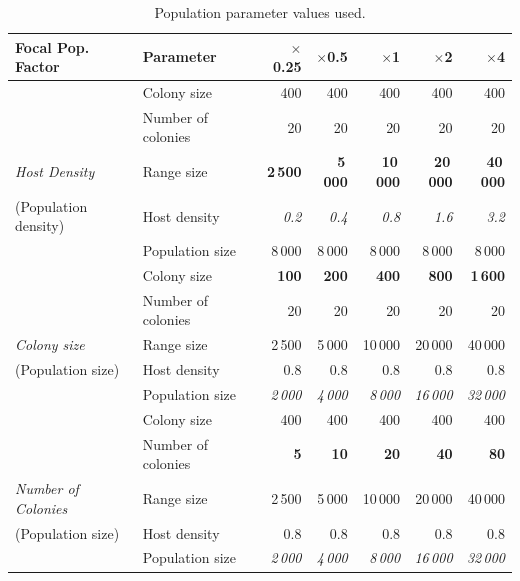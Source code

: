 \begin{table}

\caption[Population parameter values]{
Population parameter values used.
}
\label{t:popParams}
\centering
\begin{tabular}{@{}llrrrrr@{}}
\toprule
Focal Pop. Factor & Parameter & $\times$0.25 & $\times$0.5 & $\times$1 & $\times$2 & $\times$4\\
\midrule
                   & Colony size & 400 & 400 & 400 & 400 & 400 \\
                   & Number of colonies & 20 & 20 & 20 & 20 & 20 \\
\emph{Host Density}& Range size & \textbf{2\,500} & \textbf{5\,000} & \textbf{10\,000} & \textbf{20\,000} & \textbf{40\,000} \\ 
(Population density)& Host density & \emph{0.2} & \emph{0.4} & \emph{0.8} & \emph{1.6} & \emph{3.2} \\
                   & Population size & 8\,000 & 8\,000 & 8\,000 & 8\,000 & 8\,000 \\[4mm]
%
                   & Colony size & \textbf{100} & \textbf{200} & \textbf{400} &\textbf{800} & \textbf{1\,600} \\
                   & Number of colonies & 20 & 20 & 20 & 20 & 20 \\
\emph{Colony size} & Range size & 2\,500 & 5\,000 & 10\,000 & 20\,000 & 40\,000 \\
(Population size)  & Host density & 0.8 & 0.8 & 0.8 & 0.8 & 0.8 \\
                   & Population size & \emph{2\,000} & \emph{4\,000} & \emph{8\,000} & \emph{16\,000} & \emph{32\,000} \\[4mm]
                   & Colony size & 400 & 400 & 400 & 400 & 400 \\
                   & Number of colonies & \textbf{5} & \textbf{10} & \textbf{20} & \textbf{40} & \textbf{80} \\
\emph{Number of Colonies} & Range size & 2\,500 & 5\,000 & 10\,000 & 20\,000 & 40\,000 \\
(Population size)  & Host density & 0.8 & 0.8 & 0.8 & 0.8 & 0.8 \\
                   & Population size & \emph{2\,000} & \emph{4\,000} & \emph{8\,000} & \emph{16\,000} & \emph{32\,000} \\
\bottomrule

\end{tabular}
\end{table}







